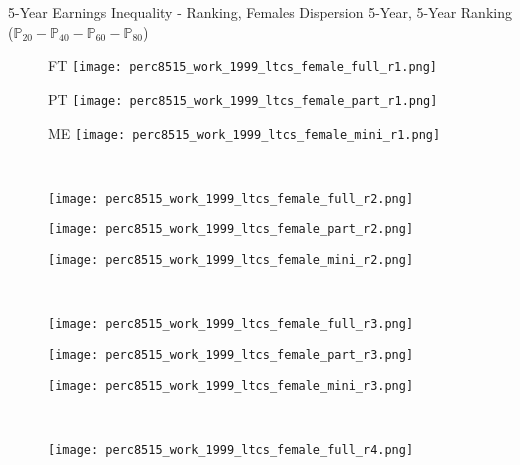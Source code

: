 \documentclass[hyperref={bookmarks=false}]{beamer}
\begin{document}
\begin{appendix}
\begin{frame}{5-Year Earnings Inequality - Ranking, Females}
Dispersion 5-Year, 5-Year Ranking ($\mathbb{P}_{20}-\mathbb{P}_{40}-\mathbb{P}_{60}-\mathbb{P}_{80}$)
\begin{figure}[!t]
\begin{minipage}[b]{0.15\textwidth}{FT}
\centering
\texttt{[image: perc8515\_work\_1999\_ltcs\_female\_full\_r1.png]}
\end{minipage}
\begin{minipage}[b]{0.15\textwidth}{PT}
\centering
\texttt{[image: perc8515\_work\_1999\_ltcs\_female\_part\_r1.png]}
\end{minipage}
\begin{minipage}[b]{0.15\textwidth}{ME}
\centering
\texttt{[image: perc8515\_work\_1999\_ltcs\_female\_mini\_r1.png]}
\end{minipage}\\
\begin{minipage}[b]{0.15\textwidth}{}
\centering
\texttt{[image: perc8515\_work\_1999\_ltcs\_female\_full\_r2.png]}
\end{minipage}
\begin{minipage}[b]{0.15\textwidth}{}
\centering
\texttt{[image: perc8515\_work\_1999\_ltcs\_female\_part\_r2.png]}
\end{minipage}
\begin{minipage}[b]{0.15\textwidth}{}
\centering
\texttt{[image: perc8515\_work\_1999\_ltcs\_female\_mini\_r2.png]}
\end{minipage}\\
\begin{minipage}[b]{0.15\textwidth}{}
\centering
\texttt{[image: perc8515\_work\_1999\_ltcs\_female\_full\_r3.png]}
\end{minipage}
\begin{minipage}[b]{0.15\textwidth}{}
\centering
\texttt{[image: perc8515\_work\_1999\_ltcs\_female\_part\_r3.png]}
\end{minipage}
\begin{minipage}[b]{0.15\textwidth}{}
\centering
\texttt{[image: perc8515\_work\_1999\_ltcs\_female\_mini\_r3.png]}
\end{minipage}\\
\begin{minipage}[b]{0.15\textwidth}{}
\centering
\texttt{[image: perc8515\_work\_1999\_ltcs\_female\_full\_r4.png]}
\end{minipage}

\end{figure}
\end{frame}
\end{appendix}
\end{document}
